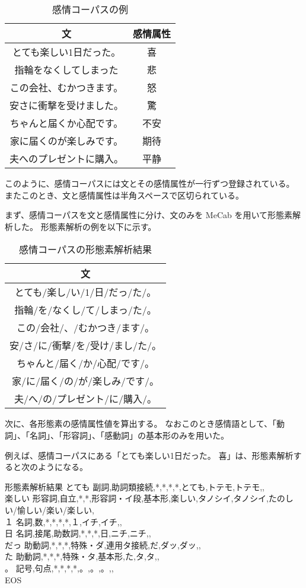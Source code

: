 \documentclass[11pt,a4j]{jsarticle}
\begin{document}
\begin{table}[htb]
  \caption{感情コーパスの例}
  \centering
  \begin{tabular}{c|c} \hline
    文 & 感情属性 \\ \hline \hline
    とても楽しい1日だった。 & 喜 \\
    指輪をなくしてしまった & 悲 \\
    この会社、むかつきます。 & 怒 \\ 
    安さに衝撃を受けました。 & 驚 \\
    ちゃんと届くか心配です。 & 不安 \\
    家に届くのが楽しみです。 & 期待 \\
    夫へのプレゼントに購入。& 平静 \\ \hline
  \end{tabular}
\end{table}

このように、感情コーパスには文とその感情属性が一行ずつ登録されている。
またこのとき、文と感情属性は半角スペースで区切られている。

まず、感情コーパスを文と感情属性に分け、文のみを MeCab を用いて形態素解析した。
形態素解析の例を以下に示す。

\begin{table}[htb]
  \caption{感情コーパスの形態素解析結果}
  \centering
  \begin{tabular}{c} \hline
    文\\ \hline \hline
    とても/楽し/い/1/日/だっ/た/。\\
    指輪/を/なくし/て/しまっ/た/。\\
    この/会社/、/むかつき/ます/。 \\ 
    安/さ/に/衝撃/を/受け/まし/た/。\\
    ちゃんと/届く/か/心配/です/。\\
    家/に/届く/の/が/楽しみ/です/。\\
    夫/へ/の/プレゼント/に/購入/。\\ \hline
  \end{tabular}
\end{table}


次に、各形態素の感情属性値を算出する。
なおこのとき感情語として、「動詞」、「名詞」、「形容詞」、「感動詞」の基本形のみを用いた。

例えば、感情コーパスにある「とても楽しい1日だった。 喜」は、形態素解析すると次のようになる。

  \begin{itembox}{形態素解析結果}
    とても	副詞,助詞類接続,*,*,*,*,とても,トテモ,トテモ,,\\
    楽しい	形容詞,自立,*,*,形容詞・イ段,基本形,楽しい,タノシイ,タノシイ,たのしい/愉しい/楽い/楽しい,\\
    １	名詞,数,*,*,*,*,１,イチ,イチ,,\\
    日	名詞,接尾,助数詞,*,*,*,日,ニチ,ニチ,,\\
    だっ	助動詞,*,*,*,特殊・ダ,連用タ接続,だ,ダッ,ダッ,,\\
    た	助動詞,*,*,*,特殊・タ,基本形,た,タ,タ,,\\
    。	記号,句点,*,*,*,*,。,。,。,,\\
    EOS
  \end{itembox}
\end{document}
